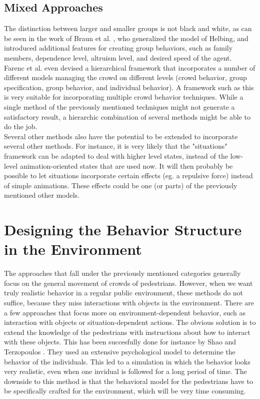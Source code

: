 \documentclass[11pt]{book}
\begin{document}
\subsection{Mixed Approaches}
The distinction between larger and smaller groups is not black and white, as can be seen in the work of Braun et al. \cite{10.1109CASA.2003.1199317}, who generalized the model of Helbing, and introduced additional features for creating group behaviors, such as family members, dependence level, altruism level, and desired speed of the agent.\\
Farenc et al. even devised a hierarchical framework that incorporates a number of different models managing the crowd on different levels (crowd behavior, group specification, group behavior, and individual behavior). A framework such as this is very suitable for incorporating multiple crowd behavior techniques. While a single method of the previously mentioned techniques might not generate a satisfactory result, a hierarchic combination of several methods might be able to do the job.\\
Several other methods also have the potential to be extended to incorporate several other methods. For instance, it is very likely that the "situations" framework can be adapted to deal with higher level states, instead of the low-level animation-oriented states that are used now. It will then probably be possible to let situations incorporate certain effects (eg. a repulsive force) instead of simple animations. These effects could be one (or parts) of the previously mentioned other models.



\section{Designing the Behavior Structure in the Environment}
The approaches that fall under the previously mentioned categories generally focus on the general movement of crowds of pedestrians. However, when we want truly realistic behavior in a regular public environment, these methods do not suffice, because they miss interactions with objects in the environment. There are a few approaches that focus more on environment-dependent behavior, such as interaction with objects or situation-dependent actions.
The obvious solution is to extend the knowledge of the pedestrians with instructions about how to interact with these objects. This has been succesfully done for instance by Shao and Terzopoulos \cite{A_autonomouspedestrians}. They used an extensive psychological model to determine the behavior of the individuals. This led to a simulation in which the behavior looks very realistic, even when one invidual is followed for a long period of time. The downside to this method is that the behavioral model for the pedestrians have to be specifically crafted for the environment, which will be very time consuming.
\end{document}
